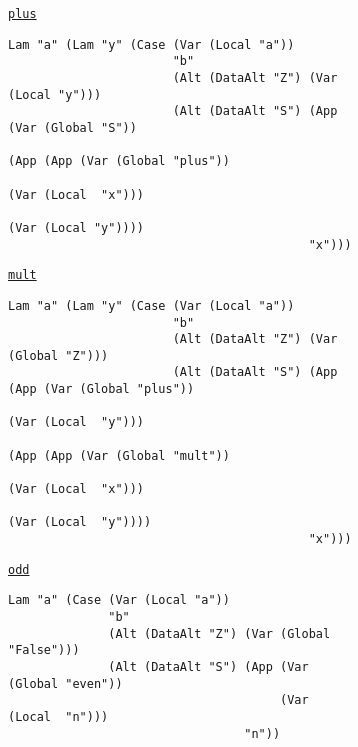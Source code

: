 \begin{figure}
  \begin{subfigure}[plus]{\textwidth}
    \begin{small}
      \underline{\texttt{plus}}
      \begin{verbatim}
Lam "a" (Lam "y" (Case (Var (Local "a"))
                       "b"
                       (Alt (DataAlt "Z") (Var (Local "y")))
                       (Alt (DataAlt "S") (App (Var (Global "S"))
                                               (App (App (Var (Global "plus"))
                                                         (Var (Local  "x")))
                                                    (Var (Local "y"))))
                                          "x")))
      \end{verbatim}
    \end{small}
  \end{subfigure}
  \begin{subfigure}[mult]{\textwidth}
    \begin{small}
      \underline{\texttt{mult}}
      \begin{verbatim}
Lam "a" (Lam "y" (Case (Var (Local "a"))
                       "b"
                       (Alt (DataAlt "Z") (Var (Global "Z")))
                       (Alt (DataAlt "S") (App (App (Var (Global "plus"))
                                                    (Var (Local  "y")))
                                               (App (App (Var (Global "mult"))
                                                         (Var (Local  "x")))
                                                    (Var (Local  "y"))))
                                          "x")))
      \end{verbatim}
    \end{small}
  \end{subfigure}
  \begin{subfigure}[odd]{\textwidth}
    \begin{small}
      \underline{\texttt{odd}}
      \begin{verbatim}
Lam "a" (Case (Var (Local "a"))
              "b"
              (Alt (DataAlt "Z") (Var (Global "False")))
              (Alt (DataAlt "S") (App (Var (Global "even"))
                                      (Var (Local  "n")))
                                 "n"))
      \end{verbatim}
    \end{small}
  \end{subfigure}
  \begin{subfigure}[even]{\textwidth}

\end{subfigure}
\end{figure}
